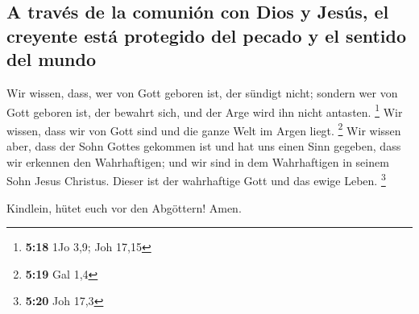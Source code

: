 \hypertarget{a-travuxe9s-de-la-comuniuxf3n-con-dios-y-jesuxfas-el-creyente-estuxe1-protegido-del-pecado-y-el-sentido-del-mundo}{%
\subsection{A través de la comunión con Dios y Jesús, el creyente está
protegido del pecado y el sentido del
mundo}\label{a-travuxe9s-de-la-comuniuxf3n-con-dios-y-jesuxfas-el-creyente-estuxe1-protegido-del-pecado-y-el-sentido-del-mundo}}

 Wir wissen, dass, wer von Gott geboren ist, der sündigt
nicht; sondern wer von Gott geboren ist, der bewahrt sich, und der Arge
wird ihn nicht antasten. \footnote{\textbf{5:18} 1Jo 3,9; Joh 17,15}
 Wir wissen, dass wir von Gott sind und die ganze Welt im
Argen liegt. \footnote{\textbf{5:19} Gal 1,4}  Wir wissen
aber, dass der Sohn Gottes gekommen ist und hat uns einen Sinn gegeben,
dass wir erkennen den Wahrhaftigen; und wir sind in dem Wahrhaftigen in
seinem Sohn Jesus Christus. Dieser ist der wahrhaftige Gott und das
ewige Leben. \footnote{\textbf{5:20} Joh 17,3}

 Kindlein, hütet euch vor den Abgöttern! Amen.
